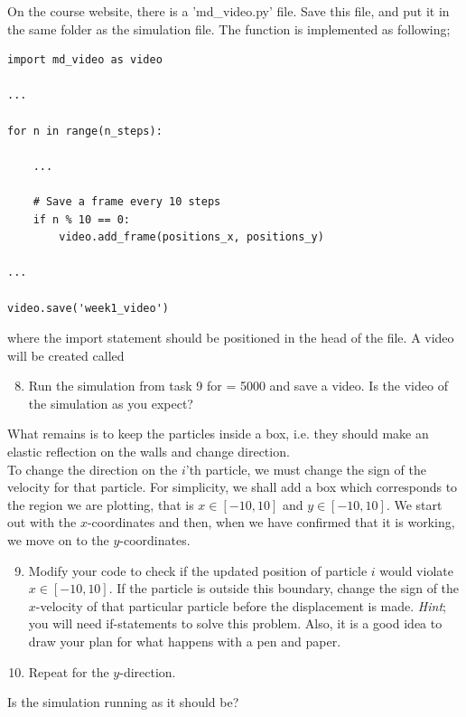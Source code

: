 \documentclass{article}
\begin{document}
On the course website, there is a 'md\_video.py' file.
Save this file, and put it in the same folder as the simulation file.
The function is implemented as following;

\begin{lstlisting}
import md_video as video

...

for n in range(n_steps):

    ...

    # Save a frame every 10 steps
    if n % 10 == 0:
        video.add_frame(positions_x, positions_y)

...

video.save('week1_video')

\end{lstlisting}

where the import statement should be positioned in the head of the file.
A video will be created called 

\begin{enumerate}
  \setcounter{enumi}{7}
  \item Run the simulation from task 9 for  = 5000 and save a video.
    Is the video of the simulation as you expect?

\end{enumerate}

What remains is to keep the particles inside a box, i.e. they should make an elastic reflection on the walls and change direction. \\

To change the direction on the $i$'th particle, we must change the sign of the velocity for that particle.
For simplicity, we shall add a box which corresponds to the region we are plotting, that is $x \in [-10,10]$ and $y \in [-10,10]$.
We start out with the $x$-coordinates and then, when we have confirmed that it is working, we move on to the $y$-coordinates.

\begin{enumerate}
  \setcounter{enumi}{8}
  \item Modify your code to check if the updated position of particle $i$ would violate $x \in [-10,10]$.
      If the particle is outside this boundary, change the sign of the $x$-velocity of that
      particular particle before the displacement is made.
      {\em Hint}; you will need if-statements to solve this problem. Also, it is a good idea to draw your plan for what happens with a pen and paper.

  \item Repeat for the $y$-direction.

\end{enumerate}

Is the simulation running as it should be?

\end{document}
